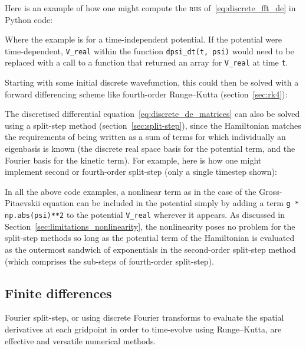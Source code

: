 Here is an example of how one might compute the \textsc{rhs} of~\eqref{eq:discrete_fft_de} in Python code:


Where the example is for a time-independent potential. If the potential were time-dependent, \texttt{V\_real} within the function \texttt{dpsi\_dt(t, psi)} would need to be replaced with a call to a function that returned an array for \texttt{V\_real} at time \texttt{t}.

Starting with some initial discrete wavefunction, this could then be solved with a forward differencing scheme like fourth-order Runge--Kutta (section~\ref{sec:rk4}):


The discretised differential equation~\eqref{eq:discrete_de_matrices} can also be solved using a split-step method (section~\ref{sec:split-step}), since the Hamiltonian matches the requirements of being written as a sum of terms for which individually an eigenbasis is known (the discrete real space basis for the potential term, and the Fourier basis for the kinetic term). For example, here is how one might implement second or fourth-order split-step (only a single timestep shown):


In all the above code examples, a nonlinear term as in the case of the Gross-Pitaevskii equation can be included in the potential simply by adding a term \texttt{g * np.abs(psi)**2} to the potential \texttt{V\_real} wherever it appears. As discussed in Section~\ref{sec:limitations_nonlinearity}, the nonlinearity poses no problem for the split-step methods so long as the potential term of the Hamiltonian is evaluated as the outermost sandwich of exponentials in the second-order split-step method (which comprises the sub-steps of fourth-order split-step).

\subsection{Finite differences}\label{sec:finite_differences}
Fourier split-step, or using discrete Fourier transforms to evaluate the spatial derivatives at each gridpoint in order to time-evolve using Runge--Kutta, are effective and versatile numerical methods.

